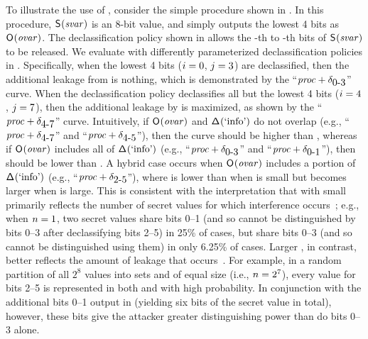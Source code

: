 To illustrate the use of
\JaccardWithDeclass{\secretsSetSize}, consider the
simple procedure shown in .  In this
procedure, $\mathsf{S}_{}(\mathit{svar})$ is an 8-bit value, and \proc simply
outputs the lowest 4 bits as $\mathsf{O}_{}(\mathit{ovar})$.  The
declassification policy shown in  allows
the \declassifyLo-th to \declassifyHi-th bits of
$\mathsf{S}_{}(\mathit{svar})$ to be released.  We evaluate
\JaccardWithDeclass{\secretsSetSize} with differently
parameterized declassification policies in
.  Specifically, when the lowest
4 bits ($i=0$, $j=3$) are declassified, then
the additional leakage from \proc is nothing, which is demonstrated by
the ``$\mathit{proc}+\delta_{\mbox{0-3}}$'' curve. When the declassification
policy declassifies all but the lowest 4 bits ($i=4$,
$j=7$), then the additional leakage by \proc is maximized,
as shown by the ``$\mathit{proc}+\delta_{\mbox{4-7}}$'' curve.  Intuitively, if
$\mathsf{O}_{}(\mathit{ovar})$ and $\mathsf{\Delta}_{}(\text{`info'})$ do not overlap
(e.g., ``$\mathit{proc}+\delta_{\mbox{4-7}}$'' and ``$\mathit{proc}+\delta_{\mbox{4-5}}$''),
then the \JaccardWithDeclass{\secretsSetSize} curve
should be higher than \JaccardRand{\secretsSetSize}, whereas if
$\mathsf{O}_{}(\mathit{ovar})$ includes all of $\mathsf{\Delta}_{}(\text{`info'})$ (e.g.,
``$\mathit{proc}+\delta_{\mbox{0-3}}$'' and ``$\mathit{proc}+\delta_{\mbox{0-1}}$''), then
\JaccardWithDeclass{\secretsSetSize} should be lower
than \JaccardRand{\secretsSetSize}.  A hybrid case occurs when
$\mathsf{O}_{}(\mathit{ovar})$ includes a portion of $\mathsf{\Delta}_{}(\text{`info'})$
(e.g., ``$\mathit{proc}+\delta_{\mbox{2-5}}$''), where
\JaccardWithDeclass{\secretsSetSize} is lower than
\JaccardRand{\secretsSetSize} when \secretsSetSize is small but
becomes larger when \secretsSetSize is large. This is consistent with
the interpretation that \JaccardWithDeclass{\secretsSetSize} with
small \secretsSetSize primarily reflects the number of secret values
for which interference occurs~\cite{sscf}; e.g., when
$n = 1$, two secret values share bits 0--1 (and so
cannot be distinguished by bits 0--3 after declassifying bits 2--5) in
25\% of cases, but share bits 0--3 (and so cannot be distinguished
using them) in only 6.25\% of cases. Larger \secretsSetSize, in
contrast, better reflects the amount of leakage that
occurs~\cite{sscf}. For example, in a random partition of all $2^8$
values into sets \secretsSet{} and \secretsSetAlt{} of equal size
(i.e., $n = 2^7$), every value for bits 2--5 is
represented in both \secretsSet{} and \secretsSetAlt{} with high
probability.  In conjunction with the additional bits 0--1 output in
\AOOFn{} (yielding six bits of the secret value in total), however,
these bits give the attacker greater distinguishing power than do bits
0--3 alone.

